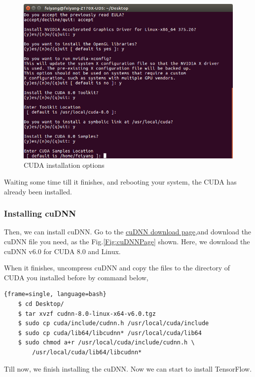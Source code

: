 \documentclass[12pt,letterpaper]{article}
\begin{document}
	\begin{figure}[http]
		\centering
	\includegraphics[scale=0.5]{./QuestionsCUDA.png}
		\caption{\label{Fig:QuestionsCUDA}CUDA installation options}
	\end{figure}
	
	Waiting some time till it finishes, and rebooting your system, the CUDA has already been installed. 
	
	\subsubsection{Installing cuDNN}
	Then, we can install cuDNN. Go to the \href{https://developer.nvidia.com/cudnn}{cuDNN download page},and download the cuDNN file you need, as the Fig.\ref{Fig:cuDNNPage} shown. Here, we download the cuDNN v6.0 for CUDA 8.0 and Linux.
	
 

	When it finishes, uncompress cuDNN and copy the files to the directory of CUDA you installed before by command below,
	
	\begin{lstlisting}{frame=single, language=bash}
	$ cd Desktop/
	$ tar xvzf cudnn-8.0-linux-x64-v6.0.tgz
	$ sudo cp cuda/include/cudnn.h /usr/local/cuda/include
	$ sudo cp cuda/lib64/libcudnn* /usr/local/cuda/lib64
	$ sudo chmod a+r /usr/local/cuda/include/cudnn.h \
		/usr/local/cuda/lib64/libcudnn*
	\end{lstlisting}
	
	Till now, we finish installing the cuDNN. Now we can start to install TensorFlow.
	
\end{document}

